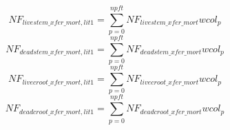 \begin{equation}
  NF_{livestem\_{xfer\_{mort,lit1}}}=\sum_{p=0}^{npft}{NF_{livestem\_{xfer\_{mort}}}{wcol_p}}
\end{equation}
\begin{equation}
NF_{deadstem\_{xfer\_{mort,lit1}}}=\sum_{p=0}^{npft}{NF_{deadstem\_{xfer\_{mort}}}{wcol_p}}
\end{equation}
\begin{equation}
  NF_{livecroot\_{xfer\_{mort,lit1}}}=\sum_{p=0}^{npft}{NF_{livecroot\_{xfer\_{mort}}}{wcol_p}}
\end{equation}
\begin{equation}
  NF_{deadcroot\_{xfer\_{mort,lit1}}}=\sum_{p=0}^{npft}{NF_{deadcroot\_{xfer\_{mort}}}{wcol_p}}
\end{equation}

